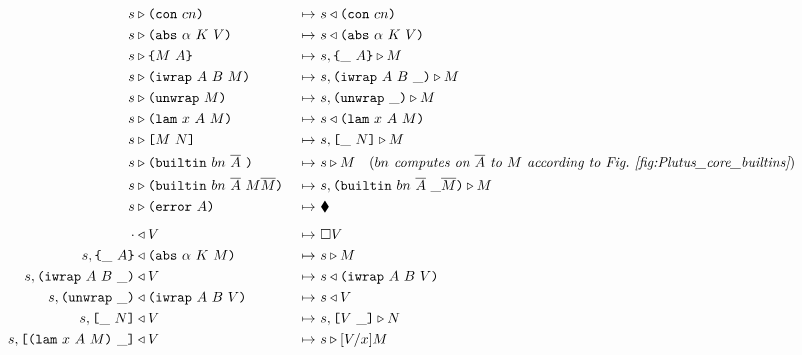 \documentclass[../plutus-core-specification.tex]{subfiles}
\begin{document}
\begin{figure}[H]
\begin{subfigure}[c]{\linewidth}
\hspace{-1cm}\begin{minipage}{\linewidth}  
\begin{alignat*}{2}
        \cksteps{\ckforward{s&}{\con{cn}}&} {&\ckbackward{s}{\con{cn}}}\\
        \cksteps{\ckforward{s&}{\abs{\alpha}{K}{V}}&} {&\ckbackward{s}{\abs{\alpha}{K}{V}}}\\
        \cksteps{\ckforward{s&}{\inst{M}{A}}&} {&\ckforward{s, \inInstLeftFrame{A}}{M}}\\
        \cksteps{\ckforward{s&}{\wrap{A}{B}{M}}&} {&\ckforward{s, \inWrapRightFrame{A}{B}}{M}}\\
        \cksteps{\ckforward{s&}{\unwrap{M}}&} {&\ckforward{s, \inUnwrapFrame{}}{M}}\\
        \cksteps{\ckforward{s&}{\lam{x}{A}{M}}&} {&\ckbackward{s}{\lam{x}{A}{M}}}\\
        \cksteps{\ckforward{s&}{\app{M}{N}}&} {&\ckforward{s, \inAppLeftFrame{N}}{M}}\\
        \cksteps{\ckforward{s&}{\builtin{bn}{\repetition{A}}{}}&} {&\ckforward{s}{M}} 
              \quad (\textit{$bn$ computes on $\repetition{A}$ to $M$ according to Fig.~\ref{fig:Plutus_core_builtins}})\\
        \cksteps{\ckforward{s&}{\builtin{bn}{\repetition{A}}{M \repetition{M}}}&} {&\ckforward{s, \inBuiltin{bn}{\repetition{A}}{}{\_}{\repetition{M}}}{M}}\\
        \cksteps{\ckforward{s&}{\error{A}}&} {&\ckerror{}}\\
        \\[-10pt] %
        \cksteps{\ckbackward{\cdot&}{V}&} {&\square V}\\
        \cksteps{\ckbackward{s, \inInstLeftFrame{A}&}{\abs{\alpha}{K}{M}}&} {&\ckforward{s}{M}}\\
        \cksteps{\ckbackward{s, \inWrapRightFrame{A}{B}&}{V}&} {&\ckbackward{s}{\wrap{A}{B}{V}}}\\
        \cksteps{\ckbackward{s, \inUnwrapFrame{}&}{\wrap{A}{B}{V}}&} {&\ckbackward{s}{V}}\\
        \cksteps{\ckbackward{s, \inAppLeftFrame{N}&}{V}&} {&\ckforward{s, \inAppRightFrame{V}}{N}}\\
        \cksteps{\ckbackward{s, \inAppRightFrame{\lam{x}{A}{M}}&}{V}&} {&\ckforward{s}{\subst{V}{x}{M}}}\\

\end{alignat*}
\end{minipage}
\end{subfigure}
\end{figure}
\end{document}
